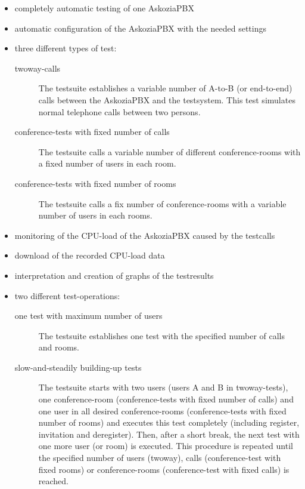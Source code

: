 \begin{itemize}
\item completely automatic testing of one AskoziaPBX
\item automatic configuration of the AskoziaPBX with the needed settings
\item three different types of test:
	\begin{description}
	\item [twoway-calls] The testsuite establishes a variable number of A-to-B (or end-to-end) calls between the AskoziaPBX and the testsystem. This test simulates normal telephone calls between two persons.
	
	\item [conference-tests with fixed number of calls] The testsuite calls a variable number of different conference-rooms with a fixed number of users in each room.

	\item [conference-tests with fixed number of rooms] The testsuite calls a fix number of conference-rooms with a variable number of users in each rooms.
	\end{description}
	
\item monitoring of the CPU-load of the AskoziaPBX caused by the testcalls
\item download of the recorded CPU-load data
\item interpretation and creation of graphs of the testresults 
\item two different test-operations:
	\begin{description}
	\item [one test with maximum number of users] The testsuite establishes one test with the specified number of calls and rooms.
	\item [slow-and-steadily building-up tests] The testsuite starts with two users (users A and B in twoway-tests), one conference-room (conference-tests with fixed number of calls) and one user in all desired conference-rooms (conference-tests with fixed number of rooms) and executes this test completely (including register, invitation and deregister). Then, after a short break, the next test with one more user (or room) is executed. This procedure is repeated until the specified number of users (twoway), calls (conference-test with fixed rooms) or conference-rooms (conference-test with fixed calls) is reached.
	\end{description}
\end{itemize}

